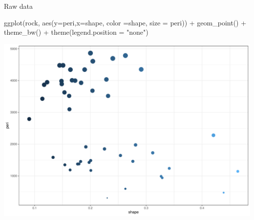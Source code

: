 \documentclass[
  ignorenonframetext,
]{beamer}
\newenvironment{Shaded}{\begin{snugshade}}{\end{snugshade}}
\newcommand{\AttributeTok}[1]{\textcolor[rgb]{0.00,0.34,0.68}{#1}}
\newcommand{\FunctionTok}[1]{\textcolor[rgb]{0.39,0.29,0.61}{#1}}
\newcommand{\NormalTok}[1]{\textcolor[rgb]{0.12,0.11,0.11}{#1}}
\newcommand{\SpecialCharTok}[1]{\textcolor[rgb]{0.24,0.68,0.91}{#1}}
\newcommand{\StringTok}[1]{\textcolor[rgb]{0.75,0.01,0.01}{#1}}
\begin{document}
\begin{frame}[fragile]{Raw data}
\protect\hypertarget{raw-data}{}
\begin{Shaded}
\begin{Highlighting}[]
\FunctionTok{ggplot}\NormalTok{(rock, }
       \FunctionTok{aes}\NormalTok{(}\AttributeTok{y=}\NormalTok{peri,}\AttributeTok{x=}\NormalTok{shape, }\AttributeTok{color =}\NormalTok{shape, }
           \AttributeTok{size =}\NormalTok{ peri)) }\SpecialCharTok{+} \FunctionTok{geom\_point}\NormalTok{() }\SpecialCharTok{+}
  \FunctionTok{theme\_bw}\NormalTok{() }\SpecialCharTok{+} \FunctionTok{theme}\NormalTok{(}\AttributeTok{legend.position =} \StringTok{"none"}\NormalTok{)}
\end{Highlighting}
\end{Shaded}

\begin{center}\includegraphics[width=0.5\linewidth]{Practice_files/figure-beamer/unnamed-chunk-60-1} \end{center}
\end{frame}
\end{document}

